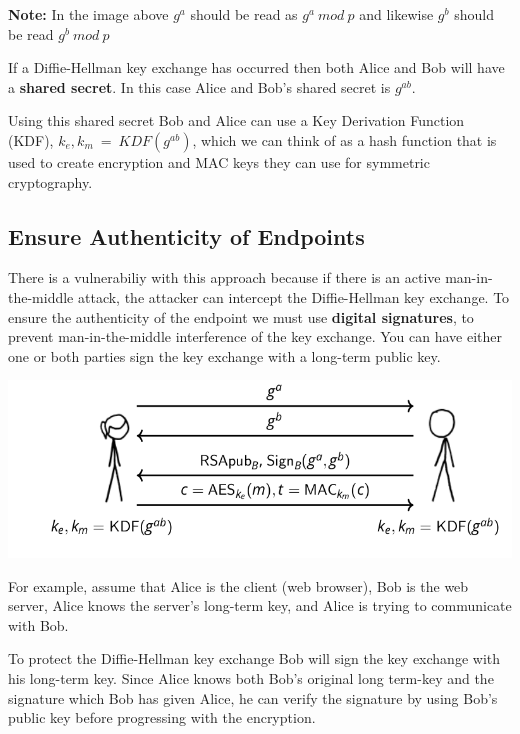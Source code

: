 \documentclass[11pt]{article} %
\begin{document}
{\parindent0pt \textbf{Note:} In the image above $g^{a}$  should be read as 
$g^{a}\ mod\ p$ and likewise $g^{b}$ should be read $g^{b}\ mod\ p$}

\bigskip
{\parindent0pt If a Diffie-Hellman key exchange has occurred then both Alice 
and Bob will have a \textbf{shared secret}. In this case Alice and Bob's shared
secret is $g^{ab}$.}

\bigskip
{\parindent0pt Using this shared secret Bob and Alice can use a Key Derivation
Function (KDF), 
\smallskip
$k_e, k_m\ =\ KDF(g^{ab})$, which we can think of as a hash function that is 
used to create encryption and MAC keys they can use for symmetric cryptography.}

\newpage
\subsection{Ensure Authenticity of Endpoints}
There is a vulnerabiliy with this approach because if there is an active
man-in-the-middle attack, the attacker can intercept the Diffie-Hellman
key exchange.  To ensure the authenticity of the endpoint we must use
\textbf{digital signatures}, to prevent man-in-the-middle interference of the
key exchange.
You can have either one or both parties sign the key exchange with a long-term
public key.

\begin{center}
	\includegraphics[scale=.7]{./tls3.png}
\end{center}

For example, assume that Alice is the client (web browser), Bob is 
the web server, Alice knows the server's long-term key, and Alice is trying to
communicate with Bob.

\bigskip
To protect the Diffie-Hellman key exchange Bob will sign the key exchange with 
his long-term key.  Since Alice knows both Bob's original long term-key and the
signature which Bob has given Alice, he can verify the signature by using Bob's
public key before progressing with the encryption.
\end{document}
